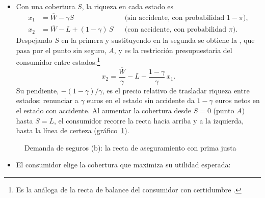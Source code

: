 \documentclass[11pt]{article}
\begin{document}
\begin{itemize}
\item Con una cobertura $S$, la riqueza en cada estado es
  \begin{equation}\label{eq:riqueza-estados}
  \begin{aligned}
  x_1&=\overline{W}-\gamma S &&\text{(sin accidente, con probabilidad } 1-\pi),\\
  x_2&=\overline{W}-L+(1-\gamma)\,S &&\text{(con accidente, con probabilidad } \pi).
  \end{aligned}
  \end{equation}
  Despejando $S$ en la primera y sustituyendo en la segunda se obtiene la , que pasa por el punto sin seguro, $A$, y es la restricción presupuestaria del consumidor entre estados:\footnote{Es la análoga de la recta de balance del consumidor con certidumbre .}
  \begin{equation}\label{eq:recta-seguro}
  x_2=\frac{\overline{W}}{\gamma}-L-\frac{1-\gamma}{\gamma}\,x_1 .
  \end{equation}
  Su pendiente, $-(1-\gamma)/\gamma$, es el precio relativo de trasladar riqueza entre estados: renunciar a $\gamma$ euros en el estado sin accidente da $1-\gamma$ euros netos en el estado con accidente. Al aumentar la cobertura desde $S=0$ (punto $A$) hasta $S=L$, el consumidor recorre la recta hacia arriba y a la izquierda, hasta la línea de certeza (gráfico~\ref{fig:seguros-b}).
\end{itemize}

\begin{figure}[H]
\centering
\caption{Demanda de seguros (b): la recta de aseguramiento con prima justa}\label{fig:seguros-b}
\end{figure}

\begin{itemize}
\item El consumidor elige la cobertura que maximiza su utilidad esperada:
\end{itemize}
\end{document}
